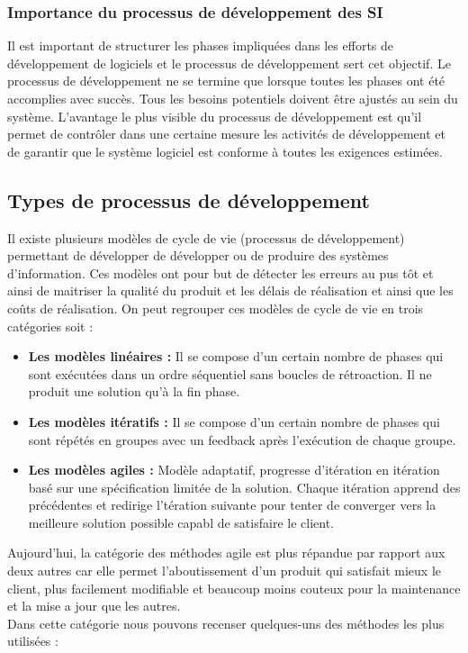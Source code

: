 \subsubsection{Importance du processus de développement des SI}
Il est important de structurer les phases impliquées dans les efforts de développement de logiciels et le processus de développement sert cet objectif. Le processus de développement ne se termine que lorsque toutes les phases ont été accomplies avec succès. Tous les besoins potentiels doivent être ajustés au sein du système. L'avantage le plus visible du processus de développement est qu'il permet de contrôler dans une certaine mesure les activités de développement et de garantir que le système logiciel est conforme à toutes les exigences estimées. 


\subsection{Types de processus de développement}
Il existe plusieurs modèles de cycle de vie (processus de développement) permettant de développer de développer ou de produire des systèmes d’information. Ces modèles ont pour but de détecter les erreurs au pus tôt et ainsi de maitriser la qualité du produit et les délais de réalisation et ainsi que les coûts de réalisation. On peut regrouper ces modèles de cycle de vie en trois catégories soit :
\begin{itemize}
    \item \textbf{Les modèles linéaires :}  Il se compose d'un certain nombre de phases qui sont exécutées dans un ordre séquentiel sans boucles de rétroaction. Il ne produit une solution qu'à la fin phase.
    \item \textbf{Les modèles itératifs :} Il se compose d'un certain nombre de phases qui sont répétés en groupes avec un feedback après l'exécution de chaque groupe.
    \item \textbf{Les modèles agiles :} Modèle adaptatif, progresse d'itération en itération basé sur une spécification limitée de la solution. Chaque itération apprend des précédentes et redirige l'tération suivante pour tenter de converger vers la meilleure solution possible capabl de satisfaire le client.
\end{itemize}

Aujourd’hui, la catégorie des méthodes agile est plus répandue par rapport aux deux autres car elle permet l’aboutissement d’un produit qui satisfait mieux le client, plus facilement modifiable et beaucoup moins couteux pour la maintenance et la mise a jour que les autres.\\
Dans cette catégorie nous pouvons recenser quelques-uns des méthodes les plus utilisées :


